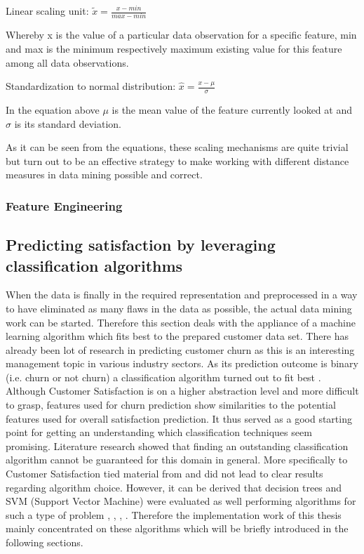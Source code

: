 Linear scaling unit: $\tilde{x} = \frac{x - min}{max - min}$

Whereby x is the value of a particular data observation for a specific feature, min and max is the minimum respectively maximum existing value for this feature among all data observations. 

Standardization to normal distribution: $\hat{x} = \frac{x - \mu}{\sigma}$

In the equation above $\mu$ is the mean value of the feature currently looked at and $\sigma$ is its standard deviation.

As it can be seen from the equations, these scaling mechanisms are quite trivial but turn out to be an effective strategy to make working with different distance measures in data mining possible and correct.

\subsubsection{Feature Engineering}
\label{sssec:featureEngineering}

\subsection{Predicting satisfaction by leveraging classification algorithms}
\label{ssec:classificationAlgorithms}
When the data is finally in the required representation and preprocessed in a way to have eliminated as many flaws in the data as possible, the actual data mining work can be started. Therefore this section deals with the appliance of a machine learning algorithm which fits best to the prepared customer data set. There has already been lot of research in predicting customer churn as this is an interesting management topic in various industry sectors. As its prediction outcome is binary (i.e. churn or not churn) a classification algorithm turned out to fit best \cite{vafeiadis2015comparison} \cite{xie2009customer}. Although Customer Satisfaction is on a higher abstraction level and more difficult to grasp, features used for churn prediction show similarities to the potential features used for overall satisfaction prediction. It thus served as a good starting point for getting an understanding which classification techniques seem promising. Literature research showed that finding an outstanding classification algorithm cannot be guaranteed for this domain in general. More specifically to Customer Satisfaction tied material from \cite{mozer2000predicting} and \cite{meinzer2016can} did not lead to clear results regarding algorithm choice. However, it can be derived that decision trees and SVM (Support Vector Machine) were evaluated as well performing algorithms for such a type of problem \cite{vafeiadis2015comparison}, \cite{xie2009customer}, \cite{mozer2000predicting}, \cite{meinzer2016can}. Therefore the implementation work of this thesis mainly concentrated on these algorithms which will be briefly introduced in the following sections.

